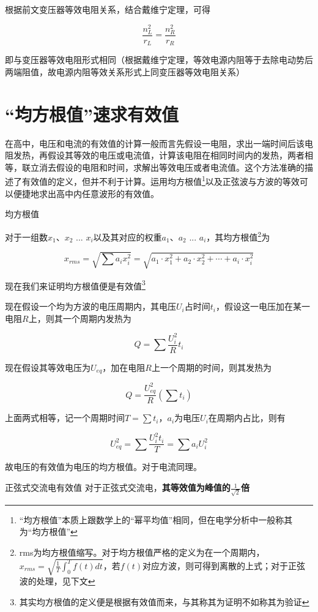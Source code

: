 根据前文变压器等效电阻关系，结合戴维宁定理，可得

$$\frac{n_L^2}{r_L} = \frac{n_R^2}{r_R}$$

即与变压器等效电阻形式相同（根据戴维宁定理，等效电源内阻等于去除电动势后两端阻值，故电源内阻等效关系形式上同变压器等效电阻关系）

\section{“均方根值”速求有效值}

在高中，电压和电流的有效值的计算一般而言先假设一电阻，求出一端时间后该电阻发热，再假设其等效的电压或电流值，计算该电阻在相同时间内的发热，两者相等，联立消去假设的电阻和时间，求解出等效电压或者电流值。这个方法准确的描述了有效值的定义，但并不利于计算。运用均方根值\footnote{“均方根值”本质上跟数学上的“幂平均值”相同，但在电学分析中一般称其为“均方根值”}以及正弦波与方波的等效可以便捷地求出高中内任意波形的有效值。

\begin{defi}{均方根值}{}

对于一组数$x_1$、$x_2$ ... $x_i$以及其对应的权重$a_1$、$a_2$ ... $a_i$，其均方根值\footnote{rms为均方根值缩写。对于均方根值严格的定义为在一个周期内，$x_{rms} = \sqrt{\frac{1}{T} \int_0^T f(t) dt}$，若$f(t)$对应方波，则可得到离散的上式；对于正弦波的处理，见下文}为

$$x_{rms} = \sqrt{\sum a_i x_i^2} = \sqrt{a_1 \cdot x_1^2 + a_2 \cdot x_2^2 + \cdots + a_i \cdot x_i^2}$$

\end{defi}

现在我们来证明均方根值便是有效值\footnote{其实均方根值的定义便是根据有效值而来，与其称其为证明不如称其为验证}

现在假设一个均为方波的电压周期内，其电压$U_i$占时间$t_i$，假设这一电压加在某一电阻$R$上，则其一个周期内发热为

$$ Q = \sum \frac{U_i^2}{R} t_i $$

现在假设其等效电压为$U_{eq}$，加在电阻$R$上一个周期的时间，则其发热为

$$ Q = \frac{U_{eq}^2}{R} (\sum t_i)$$

上面两式相等，记一个周期时间$T = \sum t_i $，$a_i$为电压$U_i$在周期内占比，则有
 
$$U_{eq}^2 = \sum \frac{U_i^2 t_i}{T} = \sum a_i U_i^2$$

故电压的有效值为电压的均方根值。对于电流同理。

\begin{theo}{正弦式交流电有效值}{}
对于正弦式交流电，\textbf{其等效值为峰值的$\frac{1}{\sqrt{2}}$倍}
\end{theo}

